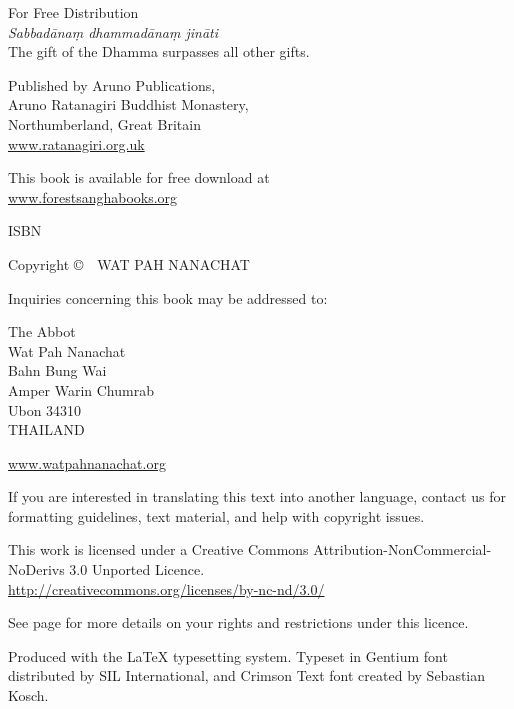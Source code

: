 {\small\setlength{\parskip}{0.8em}\setlength{\parindent}{0em}%
{\raggedright%

\thetitle

For Free Distribution\\
\emph{Sabbadānaṃ dhammadānaṃ jināti}\\
The gift of the Dhamma surpasses all other gifts.

Published by Aruno Publications,\\
Aruno Ratanagiri Buddhist Monastery,\\
Northumberland, Great Britain\\
\href{http://ratanagiri.org.uk/}{www.ratanagiri.org.uk}

This book is available for free download at\\
\href{http://forestsanghabooks.org/}{www.forestsanghabooks.org}

ISBN \theISBN

Copyright \copyright\ \the\year\ WAT PAH NANACHAT

Inquiries concerning this book may be addressed to:

The Abbot\\
Wat Pah Nanachat\\
Bahn Bung Wai\\
Amper Warin Chumrab\\
Ubon 34310\\
THAILAND

\href{http://www.watpahnanachat.org/}{www.watpahnanachat.org}

\vfill

{\footnotesize
If you are interested in translating this text into another language, contact us for formatting guidelines, text material, and help with copyright issues.

This work is licensed under a Creative Commons Attribution-NonCommercial-NoDerivs 3.0 Unported Licence.\\
\href{http://creativecommons.org/licenses/by-nc-nd/3.0/}{http://creativecommons.org/licenses/by-nc-nd/3.0/}

See page \pageref{copyright-details} for more details on your rights and restrictions under this licence.

Produced with the {\selectfont\LaTeX} typesetting system. Typeset in Gentium font distributed by SIL International, and Crimson Text font created by Sebastian Kosch.

\theEditionInfo

}

}}

